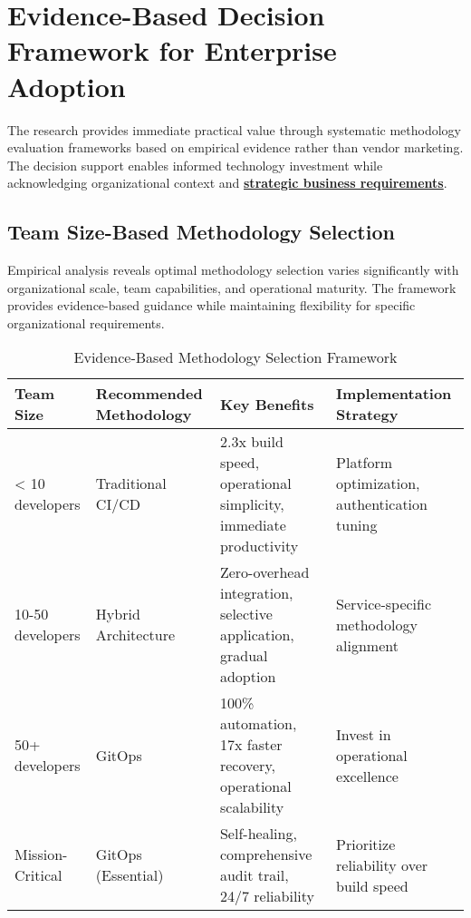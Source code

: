 \section{Evidence-Based Decision Framework for Enterprise Adoption}
\label{sec:decision_framework}

The research provides immediate practical value through systematic methodology evaluation frameworks based on empirical evidence rather than vendor marketing. The decision support enables informed technology investment while acknowledging organizational context and \textbf{\hyperref[strategic_technology_planning]{strategic business requirements}}.

\subsection{Team Size-Based Methodology Selection}
\label{subsec:team_size_selection}

Empirical analysis reveals optimal methodology selection varies significantly with organizational scale, team capabilities, and operational maturity. The framework provides evidence-based guidance while maintaining flexibility for specific organizational requirements.

\begin{table}[H]
\centering
\caption{Evidence-Based Methodology Selection Framework}
\label{tab:methodology_selection_framework}
\begin{tabular}{|p{2.5cm}|p{2.8cm}|p{3.5cm}|p{4cm}|}
\hline
\textbf{Team Size} & \textbf{Recommended Methodology} & \textbf{Key Benefits} & \textbf{Implementation Strategy} \\
\hline
< 10 developers & Traditional CI/CD & 2.3x build speed, operational simplicity, immediate productivity & Platform optimization, authentication tuning \\
\hline
10-50 developers & Hybrid Architecture & Zero-overhead integration, selective application, gradual adoption & Service-specific methodology alignment \\
\hline
50+ developers & GitOps & 100\% automation, 17x faster recovery, operational scalability & Invest in operational excellence \\
\hline
Mission-Critical & GitOps (Essential) & Self-healing, comprehensive audit trail, 24/7 reliability & Prioritize reliability over build speed \\
\hline
\end{tabular}
\end{table}

